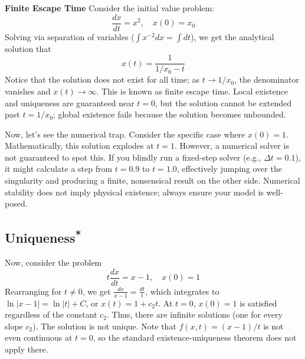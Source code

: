 \begin{exampleBox}
    \textbf{Finite Escape Time}
    Consider the initial value problem:
    \begin{equation}
        \frac{dx}{dt} = x^2, \quad x(0) = x_0
    \end{equation}
    Solving via separation of variables ($\int x^{-2} dx = \int dt$), we get the analytical solution that
    \begin{equation}
        x(t) = \frac{1}{1/x_0 - t}
    \end{equation}
    Notice that the solution does not exist for all time; as $t \to 1/x_0$, the denominator vanishes and $x(t) \to \infty$. This is known as finite escape time. Local existence and uniqueness are guaranteed near $t=0$, but the solution cannot be extended past $t=1/x_0$; global existence fails because the solution becomes unbounded.

    Now, let's see the numerical trap. Consider the specific case where $x(0)=1$. Mathematically, this solution explodes at $t=1$. However, a numerical solver is not guaranteed to spot this. If you blindly run a fixed-step solver (e.g., $\Delta t=0.1$), it might calculate a step from $t=0.9$ to $t=1.0$, effectively jumping over the singularity and producing a finite, nonsensical result on the other side. Numerical stability does not imply physical existence; always ensure your model is well-posed.
\end{exampleBox}

\subsection{\texorpdfstring{Uniqueness\textsuperscript{*}}{Uniqueness}}
Now, consider the problem
\begin{equation}
    t \frac{dx}{dt} = x - 1, \quad x(0) = 1
\end{equation}
Rearranging for $t \neq 0$, we get $\frac{dx}{x-1} = \frac{dt}{t}$, which integrates to $\ln|x-1| = \ln|t| + C$, or $x(t) = 1 + c_2 t$.
At $t=0$, $x(0)=1$ is satisfied regardless of the constant $c_2$. Thus, there are infinite solutions (one for every slope $c_2$). The solution is not unique. Note that $f(x,t) = (x-1)/t$ is not even continuous at $t=0$, so the standard existence-uniqueness theorem does not apply there.

